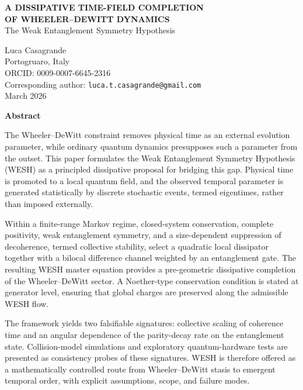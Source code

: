 \documentclass[12pt,a4paper]{article}
\numberwithin{equation}{section}
\renewenvironment{abstract}{
  \vspace*{-3cm}  
  \begin{center}
  \Large\textbf{Abstract} 
  \end{center}
  \vspace{0.5cm} 
  \noindent\ignorespaces  
}{\par\vspace{1cm}}
\begin{document}
\begin{titlepage}
{\centering 
\vspace*{2cm}
{\LARGE\bfseries
A DISSIPATIVE TIME-FIELD COMPLETION\\
OF WHEELER--DEWITT DYNAMICS\\[0.5cm]
}
\vspace{1cm}
{\Large
The Weak Entanglement Symmetry Hypothesis\\[1cm]
}
\vspace{1cm}

{\large
Luca Casagrande\\[0.3cm]
}
{\normalsize
Portogruaro, Italy\\
ORCID: 0009-0007-6645-2316\\
Corresponding author: \texttt{luca.t.casagrande@gmail.com}\\[0.5cm]
}
\vfill
{\normalsize
March 2026\\[0.5cm]
}
}
\end{titlepage}

\vspace{0.3cm}
\begin{abstract}
The Wheeler--DeWitt constraint removes physical time as an external
evolution parameter, while ordinary quantum dynamics presupposes such a
parameter from the outset. This paper formulates the Weak Entanglement
Symmetry Hypothesis (WESH) as a principled dissipative proposal for
bridging this gap. Physical time is promoted to a local quantum field, and
the observed temporal parameter is generated statistically by discrete
stochastic events, termed eigentimes, rather than imposed externally.

Within a finite-range Markov regime, closed-system conservation,
complete positivity, weak entanglement symmetry, and a size-dependent
suppression of decoherence, termed collective stability, select a quadratic
local dissipator together with a bilocal difference channel weighted by
an entanglement gate. The resulting WESH master equation provides a
pre-geometric dissipative completion of the Wheeler--DeWitt sector. A
Noether-type conservation condition is stated at generator level,
ensuring that global charges are preserved along the admissible WESH flow.

The framework yields two falsifiable signatures: collective scaling of
coherence time and an angular dependence of the parity-decay rate on the
entanglement state. Collision-model simulations and exploratory
quantum-hardware tests are presented as consistency probes of these
signatures. WESH is therefore offered as a mathematically controlled
route from Wheeler--DeWitt stasis to emergent temporal order, with
explicit assumptions, scope, and failure modes.
\end{abstract}
\end{document}
